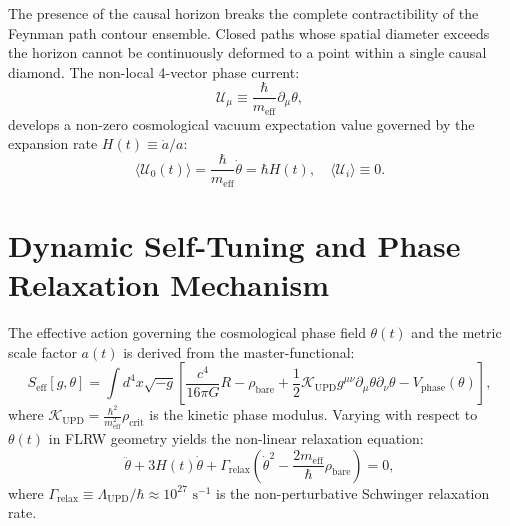 \documentclass[11pt,a4paper]{article}
\begin{document}
The presence of the causal horizon breaks the complete contractibility of the Feynman path contour ensemble. Closed paths whose spatial diameter exceeds the horizon cannot be continuously deformed to a point within a single causal diamond. The non-local 4-vector phase current:
\begin{equation}
\mathcal{U}_\mu \equiv \frac{\hbar}{m_{\mathrm{eff}}} \partial_\mu \theta,
\label{eq:phase_current_def}
\end{equation}
develops a non-zero cosmological vacuum expectation value governed by the expansion rate $H(t) \equiv \dot{a} / a$:
\begin{equation}
\langle \mathcal{U}_0(t) \rangle = \frac{\hbar}{m_{\mathrm{eff}}} \dot{\theta} = \hbar H(t), \quad \langle \mathcal{U}_i \rangle \equiv 0.
\label{eq:U0_Hubble}
\end{equation}

\section{Dynamic Self-Tuning and Phase Relaxation Mechanism}
The effective action governing the cosmological phase field $\theta(t)$ and the metric scale factor $a(t)$ is derived from the master-functional:
\begin{equation}
S_{\mathrm{eff}}[g, \theta] = \int d^4 x \sqrt{-g} \left[ \frac{c^4}{16\pi G} R - \rho_{\mathrm{bare}} + \frac{1}{2} \mathcal{K}_{\mathrm{UPD}} g^{\mu\nu} \partial_\mu \theta \partial_\nu \theta - V_{\mathrm{phase}}(\theta) \right],
\label{eq:S_eff}
\end{equation}
where $\mathcal{K}_{\mathrm{UPD}} = \frac{\hbar^2}{m_{\mathrm{eff}}^2} \rho_{\mathrm{crit}}$ is the kinetic phase modulus.
Varying with respect to $\theta(t)$ in FLRW geometry yields the non-linear relaxation equation:
\begin{equation}
\ddot{\theta} + 3 H(t) \dot{\theta} + \Gamma_{\mathrm{relax}} \left( \dot{\theta}^2 - \frac{2 m_{\mathrm{eff}}}{\hbar} \rho_{\mathrm{bare}} \right) = 0,
\label{eq:relaxation_eom}
\end{equation}
where $\Gamma_{\mathrm{relax}} \equiv \Lambda_{\mathrm{UPD}} / \hbar \approx 10^{27}\text{ s}^{-1}$ is the non-perturbative Schwinger relaxation rate.
\end{document}
